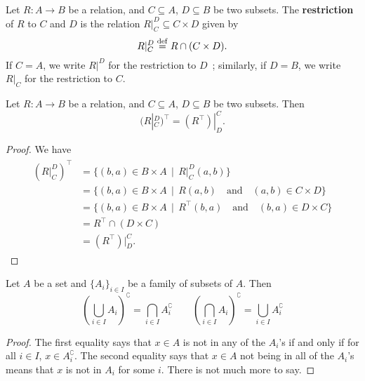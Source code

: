 \begin{definition} \label{restriction-of-relations}
	Let $R : A \to B$ be a relation, and $C \subseteq A$, $D \subseteq B$ be two subsets. The \textbf{restriction} of $R$ to $C$ and $D$ is the relation $R|_C^D \subseteq C \times D$ given by 
	\[
		R|_C^D \overset{\mathrm{def}}{=} R \cap (C \times D).	
	\]
	If $C = A$, we write $R|^D$ for the restriction to $D$~; similarly, if $D=B$, we write $R|_C$ for the restriction to $C$. 
\end{definition}

\begin{proposition}
	Let $R : A \to B$ be a relation, and $C \subseteq A$, $D \subseteq B$ be two subsets. Then
	\[
		(R|_C^D)^{\top} = (R^{\top})|_D^C.	
	\]
\end{proposition}

\begin{proof}
	We have 
	\begin{gather*}
		\begin{aligned}
			(R|_C^D)^{\top} 
			& = \{ (b,a) \in B \times A \, \mid \, R|_C^D(a,b) \}	\\
			& = \{ (b,a) \in B \times A \, \mid \, R(a,b) \quad \text{and} \quad (a,b) \in C \times D \}	\\
			& = \{ (b,a) \in B \times A \, \mid \, R^{\top}(b,a) \quad \text{and} \quad (b,a) \in D \times C \}	\\
			& = R^{\top} \cap (D \times C)	\\
			& = (R^{\top})|_D^C.
		\end{aligned}
	\end{gather*}
\end{proof}

\begin{theorem} \label{de-morgan-laws} %
	Let $A$ be a set and $\{A_i\}_{i \in I}$ be a family of subsets of $A$. Then
	\[
		\left( \bigcup_{i \in I} A_i \right)^{\complement} = \bigcap_{i \in I} A_i^{\complement} \qquad \left( \bigcap_{i \in I} A_i \right)^{\complement} = \bigcup_{i \in I} A_i^{\complement}
	\]
\end{theorem}

\begin{proof}
	The first equality says that $x \in A$ is not in any of the $A_i$'s if and only if for all $i \in I$, $x \in A_i^{\complement}$. The second equality says that $x \in A$ not being in all of the $A_i$'s means that $x$ is not in $A_i$ for some $i$. There is not much more to say.
\end{proof}

